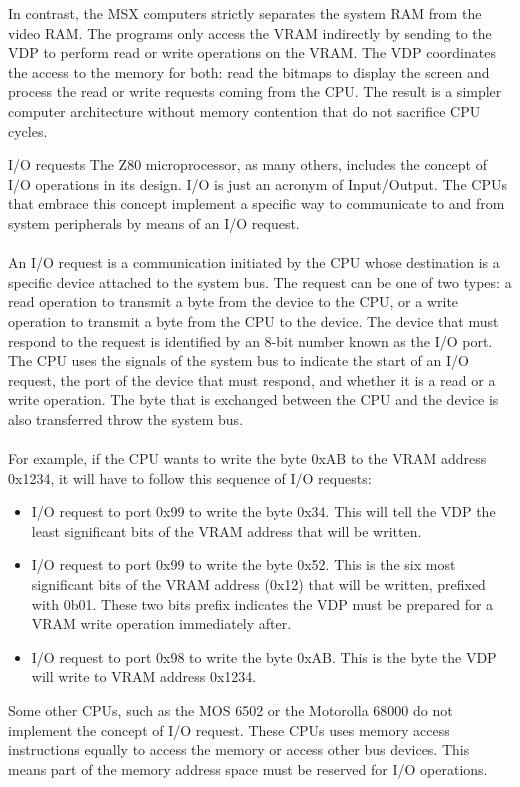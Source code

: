 In contrast, the MSX computers strictly separates the system RAM from the video RAM. The programs only access the VRAM indirectly by sending  to the VDP to perform read or write operations on the VRAM. The VDP coordinates the access to the memory for both: read the bitmaps to display the screen and process the read or write requests coming from the CPU. The result is a simpler computer architecture without memory contention that do not sacrifice CPU cycles. 

\begin{theory}{I/O requests}
	The Z80 microprocessor, as many others, includes the concept of I/O operations in its design. I/O is just an acronym of Input/Output. The CPUs that embrace this concept implement a specific way to communicate to and from system peripherals by means of an I/O request. \\\\
	
	An I/O request is a communication initiated by the CPU whose destination is a specific device attached to the system bus. The request can be one of two types: a read operation to transmit a byte from the device to the CPU, or a write operation to transmit a byte from the CPU to the device. The device that must respond to the request is identified by an 8-bit number known as the I/O port. The CPU uses the signals of the system bus to indicate the start of an I/O request, the port of the device that must respond, and whether it is a read or a write operation. The byte that is exchanged between the CPU and the device is also transferred throw the system bus. \\\\
	
	For example, if the CPU wants to write the byte 0xAB to the VRAM address 0x1234, it will have to follow this sequence of I/O requests:
	
	\begin{itemize}
		\item I/O request to port 0x99 to write the byte 0x34. This will tell the VDP the least significant bits of the VRAM address that will be written.
		\item I/O request to port 0x99 to write the byte 0x52. This is the six most significant bits of the VRAM address (0x12) that will be written, prefixed with 0b01. These two bits prefix indicates the VDP must be prepared for a VRAM write operation immediately after.
		\item I/O request to port 0x98 to write the byte 0xAB. This is the byte the VDP will write to VRAM address 0x1234.
	\end{itemize}
	
	Some other CPUs, such as the MOS 6502 or the Motorolla 68000 do not implement the concept of I/O request. These CPUs uses memory access instructions equally to access the memory or access other bus devices. This means part of the memory address space must be  reserved for I/O operations. 	
\end{theory}

